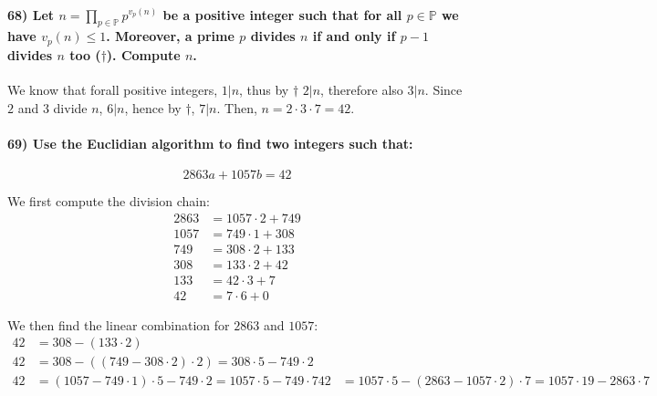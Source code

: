 \documentclass[
]{article}
\begin{document}
\hypertarget{let-n-prod_p-in-mathbbp-pv_p-n-be-a-positive-integer-such-that-for-all-p-in-mathbbp-we-have-v_pn-leq-1.-moreover-a-prime-p-divides-n-if-and-only-if-p-1-divides-n-too-dagger.-compute-n.}{%
\paragraph{\texorpdfstring{68) Let
\(n = \prod_{p \in \mathbb{P}} p^{v_p (n)}\) be a positive integer such
that for all \(p \in \mathbb{P}\) we have \(v_p(n) \leq 1\). Moreover, a
prime \(p\) divides \(n\) if and only if \(p-1\) divides \(n\) too
(\(\dagger\)). Compute
\(n\).}{68) Let n = \textbackslash prod\_\{p \textbackslash in \textbackslash mathbb\{P\}\} p\^{}\{v\_p (n)\} be a positive integer such that for all p \textbackslash in \textbackslash mathbb\{P\} we have v\_p(n) \textbackslash leq 1. Moreover, a prime p divides n if and only if p-1 divides n too (\textbackslash dagger). Compute n.}}\label{let-n-prod_p-in-mathbbp-pv_p-n-be-a-positive-integer-such-that-for-all-p-in-mathbbp-we-have-v_pn-leq-1.-moreover-a-prime-p-divides-n-if-and-only-if-p-1-divides-n-too-dagger.-compute-n.}}

We know that forall positive integers, \(1 | n\), thus by \(\dagger\)
\(2 | n\), therefore also \(3|n\). Since \(2\) and \(3\) divide \(n\),
\(6 | n\), hence by \(\dagger\), \(7 |n\). Then,
\(n = 2 \cdot 3 \cdot 7 = 42\).

\hypertarget{use-the-euclidian-algorithm-to-find-two-integers-such-that}{%
\paragraph{69) Use the Euclidian algorithm to find two integers such
that:}\label{use-the-euclidian-algorithm-to-find-two-integers-such-that}}

\[
2863a + 1057b = 42
\]

We first compute the division chain: \[
\begin{aligned}
2863 &= 1057 \cdot 2 + 749 \\
1057 &= 749 \cdot 1 + 308 \\
749 &=308 \cdot 2 + 133 \\
308 &= 133 \cdot 2 + 42 \\
133 &= 42 \cdot 3 + 7 \\
42 &= 7 \cdot 6 + 0
\end{aligned}
\]

We then find the linear combination for \(2863\) and \(1057\): \[
\begin{aligned}
42 &= 308 - (133 \cdot 2) \\
42 &= 308 - ((749 - 308 \cdot 2) \cdot 2) = 308 \cdot 5 - 749 \cdot 2\\
42 &= (1057 - 749 \cdot 1) \cdot 5 - 749 \cdot 2 = 1057 \cdot 5 - 749 \cdot 7
42 &= 1057 \cdot 5 - (2863 - 1057 \cdot 2) \cdot 7 = 1057 \cdot 19 - 2863 \cdot 7
\end{aligned}
\]
\end{document}
